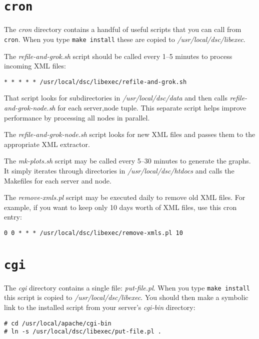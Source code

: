 \documentclass{report}
\begin{document}
\section{\tt cron}

The {\em cron\/} directory contains a handful of useful scripts that you can
call from {\tt cron\/}.  When you type {\tt make install\/} these are copied
to {\em /usr/local/dsc/libexec\/}.

The {\em refile-and-grok.sh\/} script should be called every 1--5 minutes to process
incoming XML files:

\begin{verbatim}
* * * * * /usr/local/dsc/libexec/refile-and-grok.sh
\end{verbatim}

That script looks for subdirectories in {\em /usr/local/dsc/data\/}
and then calls {\em refile-and-grok-node.sh\/} for each server,node tuple.
This separate script helps improve performance by processing all nodes
in parallel.  

The {\em refile-and-grok-node.sh\/} script looks for new XML files and passes
them to the appropriate XML extractor.  

The {\em mk-plots.sh\/} script may be called every 5--30 minutes to generate
the graphs.  It simply iterates through directories in
{\em /usr/local/dsc/htdocs\/} and calls the Makefiles for each server and node.

The {\em remove-xmls.pl\/} script may be executed daily to 
remove old XML files.  For example, if you want to keep only 10 days
worth of XML files, use this cron entry:

\begin{verbatim}
0 0 * * * /usr/local/dsc/libexec/remove-xmls.pl 10
\end{verbatim}



\section{\tt cgi}

The {\em cgi\/} directory contains a single file: {\em put-file.pl\/}.
When you type {\tt make install\/} this script is copied to
{\em /usr/local/dsc/libexec\/}.  You should then make a symbolic link
to the installed script from your server's {\em cgi-bin\/} directory:

\begin{verbatim}
# cd /usr/local/apache/cgi-bin
# ln -s /usr/local/dsc/libexec/put-file.pl .
\end{verbatim}
\end{document}
